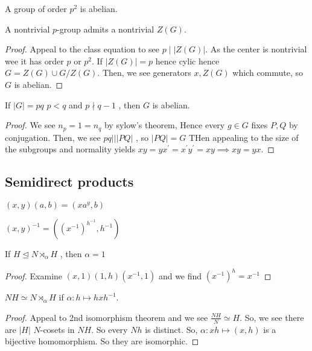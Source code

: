 \begin{theorem}
	A group of order \(p^2\) is abelian.
\end{theorem}
\begin{theorem}
	A nontrivial \(p\)-group admits a nontrivial \(Z\left( G \right) \).
\end{theorem}
\begin{proof}
	Appeal to the class equation to see \(p \mid \left| Z\left( G \right)  \right| \). As the center is nontrivial wee it has order \(p\) or \(p^2\). If \(\left| Z\left( G \right)  \right|  = p\) hence cylic hence \(G = Z\left( G \right) \cup G / Z\left( G \right) \). Then, we see generators \(x, Z\left( G \right) \) which commute, so \(G\) is abelian.
\end{proof}
\begin{theorem}
	If \(\left| G \right|  = pq\) \(p < q\)  and \(p \nmid q-1\) , then \(G\) is abelian.
\end{theorem}
\begin{proof}
	We see \(n_{p} = 1 = n_{q}\) by sylow's theorem, Hence every \(g \in G\) fixes \(P, Q\) by conjugation. Then, we see \(pq || \left| PQ \right| \) , so \(\left| PQ \right|  = G\)  THen appealing to the size of the subgroups and normality yields \(xy = yx^{\prime} = x^{\prime}y^{\prime} = xy \implies xy = yx\).
\end{proof}
\subsection{Semidirect products}
\begin{definition}
	\(\left( x, y \right) \left( a, b \right)  = (xa^{y}, b)\)
\end{definition}
\begin{remark}
	\(\left( x, y \right) ^{-1} = \left( \left( x^{-1} \right) ^{h^{-1}} , h^{-1}\right) \)
\end{remark}
\begin{theorem}
	If \(H \trianglelefteq N \rtimes_{\alpha} H\) , then \(\alpha = 1\)
\end{theorem}
\begin{proof}
	Examine \(\left( x, 1 \right) \left( 1, h \right) \left( x^{-1}, 1 \right) \) and we find \(\left( x^{-1} \right)^{h} = x^{-1}\)
\end{proof}
\begin{theorem}
	\(NH \simeq N\rtimes_{\alpha} H\) if \(\alpha: h \mapsto hxh^{-1}\).
\end{theorem}
\begin{proof}
	Appeal to 2nd isomorphism theorem and we see \(\frac{NH}{N} \simeq H\). So, we see there are \(\left| H \right| \) \(N\)-cosets in \(NH\). So every \(Nh\) is distinct. So, \(\alpha: xh \mapsto \left( x, h \right) \) is a bijective homomorphism. So they are isomorphic.
\end{proof}
